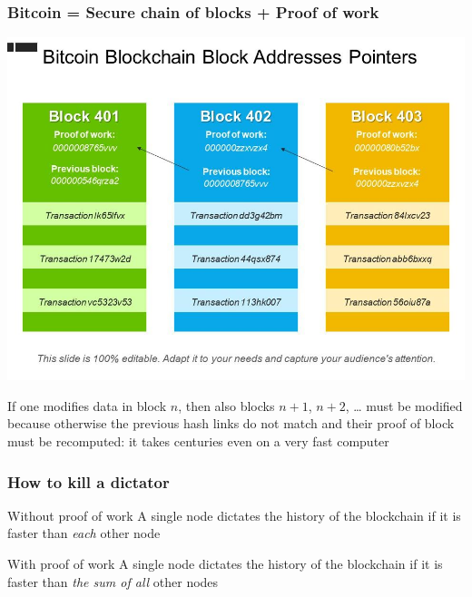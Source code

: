 \documentclass[11pt]{beamer}  %
\begin{document}
\begin{frame}\frametitle{Bitcoin = Secure chain of blocks + Proof of work}

  \begin{center}
    \includegraphics[scale=0.28,clip=false]{pictures/blocks-pow.jpg}
  \end{center}

  \begin{redbox}{}
    If one modifies data in block $n$, then also blocks $n+1$, $n+2$, \ldots
    must be modified because otherwise the previous hash links do not match
    and their proof of block must be recomputed: it takes centuries even on
    a very fast computer
  \end{redbox}

\end{frame}

\begin{frame}\frametitle{How to kill a dictator}

  \begin{greenbox}{Without proof of work}
    A single node dictates the history of the blockchain
    if it is faster than \emph{each} other node
  \end{greenbox}

  \pause
  \bigskip
  \bigskip

  \begin{greenbox}{With proof of work}
    A single node dictates the history of the blockchain
    if it is faster than \emph{the sum of all} other nodes
  \end{greenbox}

\end{frame}
\end{document}
